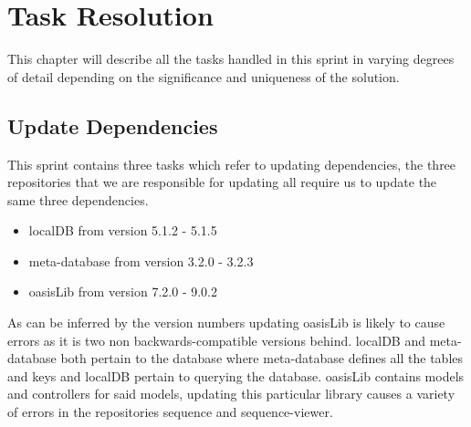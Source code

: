 \chapter{Task Resolution}
This chapter will describe all the tasks handled in this sprint in varying degrees of detail depending on the significance and uniqueness of the solution.

\section{Update Dependencies}
This sprint contains three tasks which refer to updating dependencies, the three repositories that we are responsible for updating all require us to update the same three dependencies.
\begin{itemize}
    \item localDB from version 5.1.2 - 5.1.5
    \item meta-database from version 3.2.0 - 3.2.3
    \item oasisLib from version 7.2.0 - 9.0.2
\end{itemize}
As can be inferred by the version numbers updating oasisLib is likely to cause errors as it is two non backwards-compatible versions behind.
localDB and meta-database both pertain to the database where meta-database defines all the tables and keys and localDB pertain to querying the database. 
oasisLib contains models and controllers for said models, updating this particular library causes a variety of errors in the repositories sequence and sequence-viewer.
